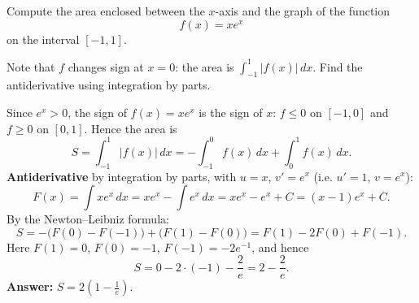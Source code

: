 
\begin{question}
Compute the area enclosed between the $x$-axis and the graph of the function
\[ f(x) = xe^x \]
on the interval $[-1, 1]$.
\end{question}

\begin{hint}
Note that $f$ changes sign at $x = 0$: the area is $\int_{-1}^1 |f(x)|\,dx$. Find the antiderivative using integration by parts.
\end{hint}

\begin{solution}
Since $e^x > 0$, the sign of $f(x) = xe^x$ is the sign of $x$: $f \le 0$ on $[-1, 0]$ and $f \ge 0$ on $[0, 1]$. Hence the area is
\[ S = \int_{-1}^1 |f(x)|\,dx = -\int_{-1}^0 f(x)\,dx + \int_0^1 f(x)\,dx. \]
\textbf{Antiderivative} by integration by parts, with $u = x$, $v' = e^x$ (i.e. $u' = 1$, $v = e^x$):
\[ F(x) = \int xe^x\,dx = xe^x - \int e^x\,dx = xe^x - e^x + C = (x - 1)e^x + C. \]
By the Newton--Leibniz formula:
\[ S = -\bigl(F(0) - F(-1)\bigr) + \bigl(F(1) - F(0)\bigr) = F(1) - 2F(0) + F(-1). \]
Here $F(1) = 0$, $F(0) = -1$, $F(-1) = -2e^{-1}$, and hence
\[ S = 0 - 2\cdot(-1) - \frac{2}{e} = 2 - \frac{2}{e}. \]
\textbf{Answer:} $\boxed{S = 2\left(1 - \frac1e\right)}$.
\end{solution}
